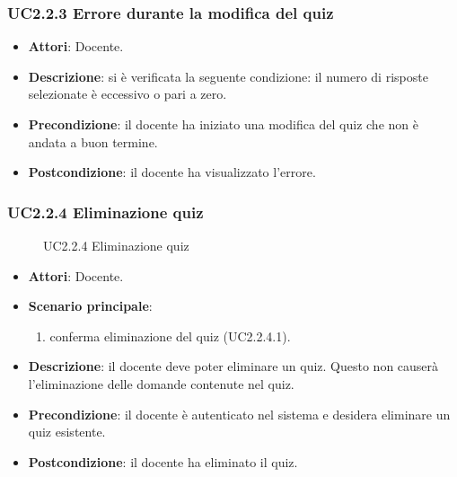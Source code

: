 \subsubsection{UC2.2.3 Errore durante la modifica del quiz}
\begin{itemize}
\item \textbf{Attori}: Docente.
\item \textbf{Descrizione}: si è verificata la seguente condizione: il numero di risposte selezionate è eccessivo o pari a zero.
\item \textbf{Precondizione}: il docente ha iniziato una modifica del quiz che non è andata a buon termine.
\item \textbf{Postcondizione}: il docente ha visualizzato l'errore.
\end{itemize}
\subsubsection{UC2.2.4 Eliminazione quiz}
\begin{figure}[H]
\centering
\noindent{}
\caption{UC2.2.4 Eliminazione quiz}
\end{figure}
\begin{itemize}
\item \textbf{Attori}: Docente.
\item \textbf{Scenario principale}:
\begin{enumerate}
\item conferma eliminazione del quiz (UC2.2.4.1).
\end{enumerate}
\item \textbf{Descrizione}: il docente deve poter eliminare un quiz. Questo non causerà l'eliminazione delle domande contenute nel quiz.
\item \textbf{Precondizione}: il docente è autenticato nel sistema e desidera eliminare un quiz esistente.
\item \textbf{Postcondizione}: il docente ha eliminato il quiz.
\end{itemize}
